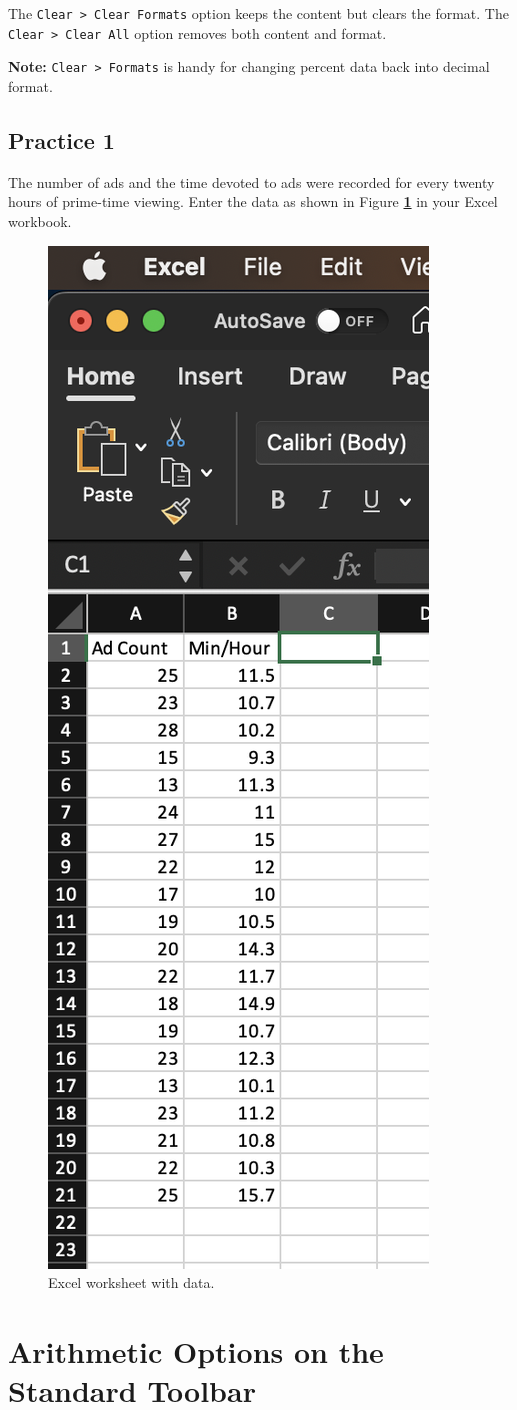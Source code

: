 \documentclass[
  12pt,
  letterpaper,
]{book}
\begin{document}
The \texttt{Clear\ \textgreater{}\ Clear\ Formats} option keeps the content but clears the format. The \texttt{Clear\ \textgreater{}\ Clear\ All} option removes both content and format.

\textbf{Note:} \texttt{Clear\ \textgreater{}\ Formats} is handy for changing percent data back into decimal format.

\hypertarget{practice-1}{%
\subsection{Practice 1}\label{practice-1}}

The number of ads and the time devoted to ads were recorded for every twenty hours of prime-time viewing. Enter the data as shown in Figure \textbf{\ref{fig:entering-data}} in your Excel workbook.

\begin{figure}

{\centering \includegraphics[width=0.35\linewidth]{images/entering_data} 

}

\caption{Excel worksheet with data.}\label{fig:entering-data}
\end{figure}

\hypertarget{arithmetic-options-on-the-standard-toolbar}{%
\section{Arithmetic Options on the Standard Toolbar}\label{arithmetic-options-on-the-standard-toolbar}}
\end{document}
